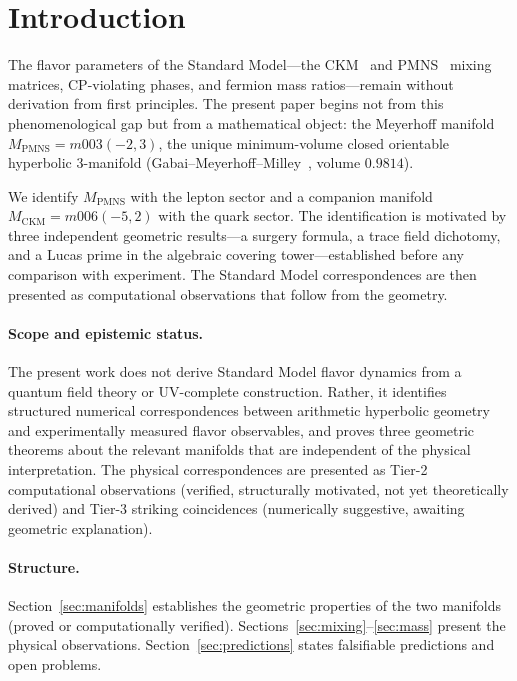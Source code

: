 \documentclass[11pt,a4paper]{article}
\theoremstyle{definition}
\theoremstyle{remark}
\newcommand{\MPMNS}{M_{\mathrm{PMNS}}}
\newcommand{\MCKM}{M_{\mathrm{CKM}}}
\begin{document}
\tableofcontents

\section{Introduction}
\label{sec:intro}

The flavor parameters of the Standard Model---the
CKM~\cite{Kobayashi} and PMNS~\cite{Maki} mixing matrices,
CP-violating phases, and fermion mass ratios---remain without
derivation from first principles.
The present paper begins not from this phenomenological gap but from
a mathematical object: the Meyerhoff manifold $\MPMNS = m003(-2,3)$,
the unique minimum-volume closed orientable hyperbolic 3-manifold
(Gabai--Meyerhoff--Milley~\cite{GMM}, volume $0.9814$).

We identify $\MPMNS$ with the lepton sector and a companion
manifold $\MCKM = m006(-5,2)$ with the quark sector.
The identification is motivated by three independent geometric
results---a surgery formula, a trace field dichotomy, and a Lucas
prime in the algebraic covering tower---established before any
comparison with experiment.
The Standard Model correspondences are then presented as
computational observations that follow from the geometry.

\paragraph{Scope and epistemic status.}
The present work does not derive Standard Model flavor dynamics from
a quantum field theory or UV-complete construction.
Rather, it identifies structured numerical correspondences between
arithmetic hyperbolic geometry and experimentally measured flavor
observables, and proves three geometric theorems about the relevant
manifolds that are independent of the physical interpretation.
The physical correspondences are presented as Tier-2 computational
observations (verified, structurally motivated, not yet theoretically
derived) and Tier-3 striking coincidences (numerically suggestive,
awaiting geometric explanation).

\paragraph{Structure.}
Section~\ref{sec:manifolds} establishes the geometric properties
of the two manifolds (proved or computationally verified).
Sections~\ref{sec:mixing}--\ref{sec:mass} present the physical
observations.
Section~\ref{sec:predictions} states falsifiable predictions and
open problems.
\end{document}
